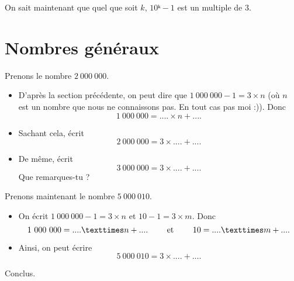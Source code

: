 \documentclass[a4paper,11pt]{article}
\begin{document}
On sait maintenant que quel que soit $k$, $10ᵏ - 1$ est un multiple de 3.

\section{Nombres généraux}

Prenons le nombre $2\ 000\ 000$.

\begin{itemize}
	\item D'après la section précédente, on peut dire que $1\ 000\ 000 - 1 = 3 × n$ (où $n$ est un nombre que nous ne connaissons pas. En tout cas pas moi :)). Donc
	      $$1\ 000\ 000 = .... × n + ....$$
	\item Sachant cela, écrit
	      $$ 2\ 000\ 000 = 3 × .... + .... $$
	\item De même, écrit
	      $$ 3\ 000\ 000 = 3 × .... + .... $$
	      Que remarques-tu ?
\end{itemize}

Prenons maintenant le nombre $5\ 000 \ 010$.
\begin{itemize}
	\item On écrit $1\ 000\ 000 - 1 = 3 × n$ et $10 - 1 = 3 × m$. Donc
	      $$ 1\ 000\ 000 = .... × n + .... \text{ \hspace{2em}et\hspace{2em} } 10 = .... × m + .... $$
	\item Ainsi, on peut écrire
	      $$ 5\ 000 \ 010 = 3 × .... + .... $$
\end{itemize}
Conclus.
\end{document}

